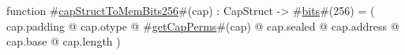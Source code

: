 function #\hyperref[zcapStructToMemBitstwofivesix]{capStructToMemBits256}#(cap) : CapStruct -> #\hyperref[zbits]{bits}#(256) =
  (
        cap.padding
      @ cap.otype
      @ #\hyperref[zgetCapPerms]{getCapPerms}#(cap)
      @ cap.sealed
      @ cap.address
      @ cap.base
      @ cap.length
  )
